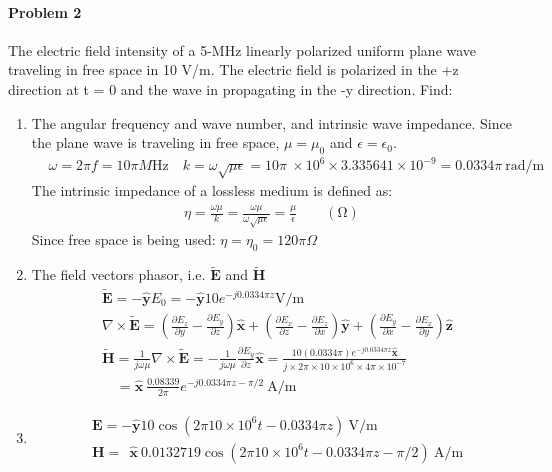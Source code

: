 \documentclass[12pt]{scrartcl}
\begin{document}
{\paragraph*{Problem 2}
The electric field intensity of a 5-MHz linearly polarized uniform plane wave traveling in free space in 10 V/m. The electric field is polarized in the +z direction at t = 0 and the wave in propagating in the -y direction. Find:
\begin{enumerate}[label=(\alph*)]
\item The angular frequency and wave number, and intrinsic wave impedance. \newline 
Since the plane wave is traveling in free space, $\mu = \mu_0$ and $\epsilon=\epsilon_0$.
\begin{align*}
& \omega = 2\pi f = 10 \pi \si{M \hertz} \quad k=\omega\sqrt{\mu \epsilon} = 10 \pi \ \times 10^6 \times 3.335641 \times 10^{-9} = 0.0334 \pi \  \si{\radian / \meter}
\end{align*}
The intrinsic impedance of a lossless medium is defined as:
\begin{align}
\eta = \frac{\omega \mu}{k}=\frac{\omega \mu}{\omega \sqrt{\mu \epsilon}}=\frac{\mu}{\epsilon} \qquad (\si{\ohm})
\end{align}
Since free space is being used: $\eta = \eta_0= 120 \pi \Omega$
\item The field vectors phasor, i.e. $\mathbf{\tilde{E}}$ and $\mathbf{\tilde{H}}$ \newline 
\begin{align*}
& \tilde{\mathbf{E}}= - \mathbf{\hat{y}}E_0=  - \mathbf{\hat{y}}10 e^{-j 0.0334 \pi  z} \si{\volt / \meter} \\
& \nabla \times \tilde{\mathbf{E}} = \left(\frac{\partial E_z}{\partial y} - \frac{\partial E_y}{\partial z} \right) \mathbf{\hat{x}} + \left(\frac{\partial E_x}{\partial z} - \frac{\partial E_z}{\partial x} \right) \mathbf{\hat{y}}
+\left(\frac{\partial E_y}{\partial x} - \frac{\partial E_x}{\partial y} \right) \mathbf{\hat{z}}\\
& \tilde{\mathbf{H}}=\frac{1}{j \omega \mu }  \nabla \times \tilde{\mathbf{E}} = - \frac{1}{j \omega \mu } \frac{\partial E_y}{\partial z}\mathbf{\hat{x}} = \frac{10(0.0334 \pi) e^{-j 0.0334 \pi  z} \mathbf{\hat{x}}}{j \times 2\pi \times 10\times 10^6\times 4 \pi \times 10^{-7}} \\
& \quad =
\mathbf{\hat{x}} \ \frac{0.08339}{2\pi} e^{-j 0.0334 \pi  z - \pi / 2} \ \si{\ampere / \meter}
\end{align*}
\item
\begin{align*}
&  \mathbf{E} = -\hat{\mathbf{y}} 10 \cos(2\pi 10 \times 10^6 t -0.0334 \pi z)  \ \si{\volt / \meter} \\
&  \mathbf{H} = \ \ \mathbf{\hat{x}} \ 0.0132719 \cos(2\pi 10 \times 10^6 t -0.0334 \pi z - \pi /2 )   \ \si{\ampere / \meter}
\end{align*}


\end{enumerate}}
\end{document}
